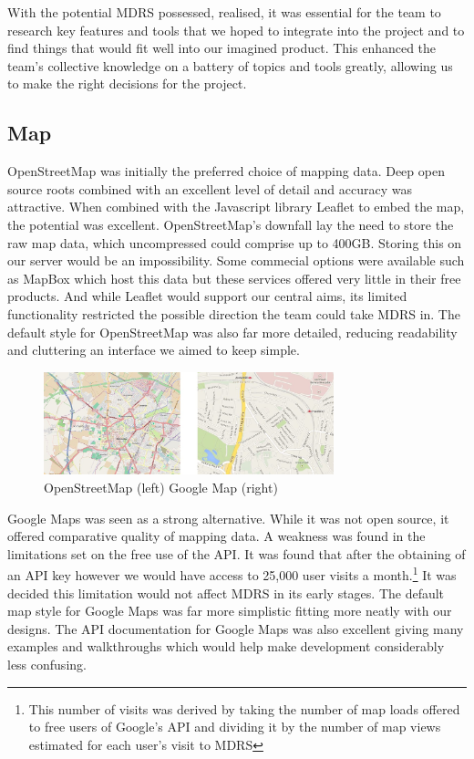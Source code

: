 \documentclass{l3proj}
\begin{document}
With the potential MDRS possessed, realised, it was essential for the team to research key features and tools that we hoped to integrate into the project and to find things that would fit well into our imagined product. This enhanced the team's collective knowledge on a battery of topics and tools greatly, allowing us to make the right decisions for the project.

\subsection{Map}

OpenStreetMap was initially the preferred choice of mapping data. Deep open source roots combined with an excellent level of detail and accuracy was attractive. When combined with the Javascript library \gls{Leaflet} to embed the map, the potential was excellent. OpenStreetMap's downfall lay the need to store the raw map data, which uncompressed could comprise up to 400GB. Storing this on our server would be an impossibility. Some commecial options were available such as MapBox which host this data but these services offered very little in their free products. And while Leaflet would support our central aims, its limited functionality restricted the possible direction the team could take MDRS in. The default style for OpenStreetMap was also far more detailed, reducing readability and cluttering an interface we aimed to keep simple.

\begin{figure}[ht!]
  \centering
\includegraphics[width=0.75\textwidth]{images/openstreetmap_google-map.jpg}
\caption{OpenStreetMap (left) Google Map (right)}
\end{figure}

Google Maps was seen as a strong alternative. While it was not open source, it offered comparative quality of mapping data. A weakness was found in the limitations set on the free use of the \gls{API}. It was found that after the obtaining of an API key however we would have access to 25,000 user visits a month.\footnote{This number of visits was derived by taking the number of map loads offered to free users of Google's API and dividing it by the number of map views estimated for each user's visit to MDRS} It was decided this limitation would not affect MDRS in its early stages. The default map style for Google Maps was far more simplistic  fitting more neatly with our designs. The API documentation for Google Maps was also excellent giving many examples and walkthroughs which would help make development considerably less confusing.
\end{document}
